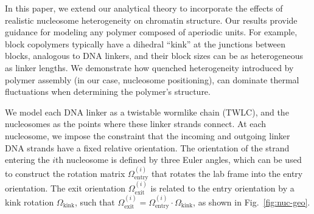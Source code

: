 \documentclass[%
 reprint,
superscriptaddress,
showpacs,preprintnumbers,
 amsmath,amssymb,
 aps,
 prl,
]{revtex4-1}
\begin{document}
In this paper, we extend our analytical theory to incorporate the effects of realistic
    nucleosome heterogeneity on chromatin structure.
Our results provide guidance for modeling any polymer composed of aperiodic units.
For example, block copolymers typically have a dihedral ``kink'' at the junctions between
    blocks, analogous to DNA linkers, and their block sizes can be as heterogeneous as linker
    lengths.
We demonstrate how quenched heterogeneity introduced by polymer assembly (in our case,
    nucleosome positioning), can dominate thermal fluctuations when determining the polymer's structure.



We model each DNA linker as a twistable wormlike chain (TWLC), and the nucleosomes as the
    points where these linker strands connect.
At each nucleosome, we impose the constraint that the incoming and outgoing
    linker DNA strands have a fixed relative orientation.
The orientation of the strand entering the $i$th nucleosome is defined by three
    Euler angles, which can be used to construct the rotation matrix
    $\Omega^{(i)}_\text{entry}$ that rotates the lab frame into the entry
    orientation.
The exit orientation $\Omega^{(i)}_\text{exit}$ is related to the entry orientation
    by a kink rotation $\Omega_\text{kink}$, such that $\Omega^{(i)}_\text{exit}
    = \Omega^{(i)}_\text{entry} \cdot \Omega_\text{kink}$, as shown in
    Fig.~\ref{fig:nuc-geo}.
\end{document}
